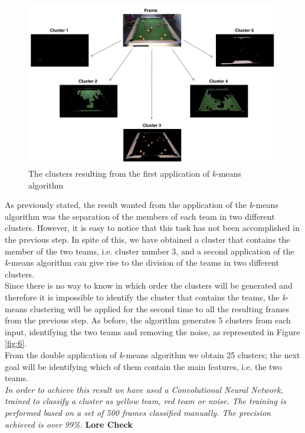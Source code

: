 \documentclass{usiinftr}
\begin{document}
\begin{figure}[h]
	\centering
	\includegraphics[width=0.8\linewidth]{./img/cluster1}
	\caption{The clusters resulting from the first application of \textit{k}-means algorithm}
	\label{fig:5}
\end{figure}
\noindent
As previously stated, the result wanted from the application of the \textit{k}-means algorithm was the separation of the members of each team in two different clusters. However, it is easy to notice that this task has not been accomplished in the previous step. In spite of this, we have obtained a cluster that contains the member of the two teams, i.e. cluster number 3, and a second application of the \textit{k}-means algorithm can give rise to the division of the teams in two different clusters. \\
Since there is no way to know in which order the clusters will be generated and therefore it is impossible to identify the cluster that contains the teams, the \textit{k}-means clustering will be applied for the second time to all the resulting frames from the previous step. As before, the algorithm generates 5 clusters from each input, identifying the two teams and removing the noise, as represented in  Figure \ref{fig:6}. \\
From the double application of \textit{k}-means algorithm we obtain 25 clusters; the next goal will be identifying which of them contain the main features, i.e. the two teams. \\
\textit{In order to achieve this result we have used a Convolutional Neural Network, trained to classify a cluster as yellow team, red team or noise. The training is performed based on a set of 500 frames classified manually. The precision achieved is over 99\%.  }\textbf{Lore Check}
\end{document}
